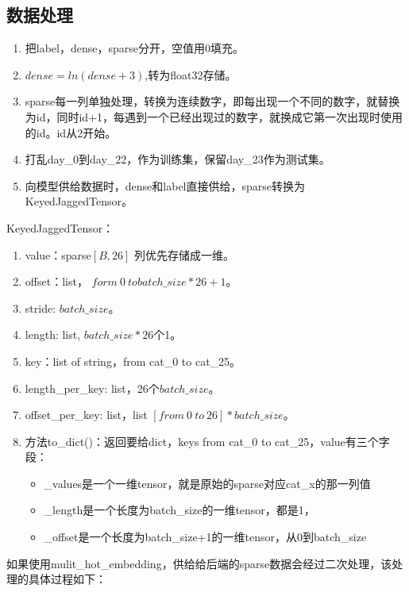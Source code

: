 \documentclass{article}
\begin{document}
\subsection{数据处理}
\begin{enumerate}
    \item 把label，dense，sparse分开，空值用0填充。
    \item $dense = ln(dense+3)$,转为float32存储。
    \item sparse每一列单独处理，转换为连续数字，即每出现一个不同的数字，就替换为id，同时id+1，每遇到一个已经出现过的数字，就换成它第一次出现时使用的id。id从2开始。
    \item 打乱day\_0到day\_22，作为训练集，保留day\_23作为测试集。
    \item 向模型供给数据时，dense和label直接供给，sparse转换为KeyedJaggedTensor。
\end{enumerate}
KeyedJaggedTensor：
\begin{enumerate}
    \item value：sparse$[B, 26]$ 列优先存储成一维。
    \item offset：list， $form\ 0\ to batch\_size*26+1$。
    \item stride: $batch\_size$。
    \item length: list, $batch\_size*26$个1。
    \item key：list of string，from cat\_0 to cat\_25。
    \item length\_per\_key: list，26个$batch\_size$。
    \item offset\_per\_key: list，list $[from\ 0\ to\ 26] * batch\_size$。
    \item 方法to\_dict()：返回要给dict，keys from cat\_0 to cat\_25，value有三个字段：
    \begin{itemize}
        \item \_values是一个一维tensor，就是原始的sparse对应cat\_x的那一列值
        \item \_length是一个长度为batch\_size的一维tensor，都是1，
        \item \_offset是一个长度为batch\_size+1的一维tensor，从0到batch\_size
    \end{itemize}
\end{enumerate}
如果使用mulit\_hot\_embedding，供给给后端的sparse数据会经过二次处理，该处理的具体过程如下：
\end{document}
